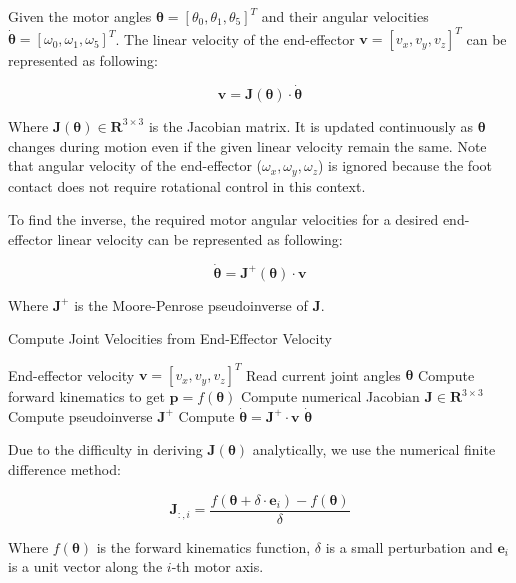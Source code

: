 \documentclass[a4paper,11pt]{article}
\begin{document}
Given the motor angles $\boldsymbol{\theta} = [\theta_0, \theta_1, \theta_5]^T$ and their angular velocities $\dot{\boldsymbol{\theta}} = [\omega_0, \omega_1, \omega_5]^T$. 
The linear velocity of the end-effector $\mathbf{v} = [v_x, v_y, v_z]^T$ can be represented as following:

$$
\mathbf{v} = \mathbf{J}(\boldsymbol{\theta}) \cdot \dot{\boldsymbol{\theta}}
$$

Where $\mathbf{J}(\boldsymbol{\theta}) \in \mathbf{R}^{3 \times 3}$ is the Jacobian matrix. It is updated continuously as $\boldsymbol{\theta}$ 
changes during motion even if the given linear velocity remain the same.
Note that angular velocity of the end-effector ($\omega_x, \omega_y, \omega_z$) is ignored because the foot contact does not require rotational control in this context.

To find the inverse, the required motor angular velocities for a desired end-effector linear velocity can be represented as following:

$$
\dot{\boldsymbol{\theta}} = \mathbf{J}^{+}(\boldsymbol{\theta}) \cdot \mathbf{v}
$$

Where $\mathbf{J}^+$ is the Moore-Penrose pseudoinverse of $\mathbf{J}$.

\begin{algorithm}[H]
	\caption{Compute Joint Velocities from End-Effector Velocity}
	\begin{algorithmic}[1]
		\Require End-effector velocity $\mathbf{v} = [v_x, v_y, v_z]^T$
		\State Read current joint angles $\boldsymbol{\theta}$
		\State Compute forward kinematics to get $\mathbf{p} = f(\boldsymbol{\theta})$
		\State Compute numerical Jacobian $\mathbf{J} \in \mathbf{R}^{3 \times 3}$
		\State Compute pseudoinverse $\mathbf{J}^{+}$
		\State Compute $\dot{\boldsymbol{\theta}} = \mathbf{J}^{+} \cdot \mathbf{v}$
		\State \Return $\dot{\boldsymbol{\theta}}$
	\end{algorithmic}
\end{algorithm}

Due to the difficulty in deriving $\mathbf{J}(\boldsymbol{\theta})$ analytically, we use the numerical finite difference method:

$$
\mathbf{J}_{:,i} = \frac{f(\boldsymbol{\theta} + \delta \cdot \mathbf{e}_i) - f(\boldsymbol{\theta})}{\delta}
$$

Where $f(\boldsymbol{\theta})$ is the forward kinematics function, $\delta$ is a small perturbation and 
$\mathbf{e}_i$ is a unit vector along the $i$-th motor axis.
\end{document}

